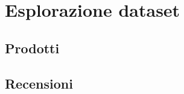 \section{Esplorazione dataset}\label{EsplorazioneDataset}

\subsection{Prodotti}

\subsection{Recensioni}
